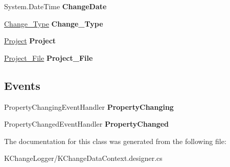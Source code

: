 \begin{DoxyCompactItemize}
\item 
\hypertarget{class_k_change_logger_1_1_project___change_ab97c8a4b413c800ba3eddd650fd732c6}{System.\-Date\-Time {\bfseries Change\-Date}}\label{class_k_change_logger_1_1_project___change_ab97c8a4b413c800ba3eddd650fd732c6}

\item 
\hypertarget{class_k_change_logger_1_1_project___change_a7b45da2b701ada3eaa770805b640a6a8}{\hyperlink{class_k_change_logger_1_1_change___type}{Change\-\_\-\-Type} {\bfseries Change\-\_\-\-Type}}\label{class_k_change_logger_1_1_project___change_a7b45da2b701ada3eaa770805b640a6a8}

\item 
\hypertarget{class_k_change_logger_1_1_project___change_abb78ee98bbba895799df42d2629fa808}{\hyperlink{class_k_change_logger_1_1_project}{Project} {\bfseries Project}}\label{class_k_change_logger_1_1_project___change_abb78ee98bbba895799df42d2629fa808}

\item 
\hypertarget{class_k_change_logger_1_1_project___change_a427442f7080c7464800dc476e048d7c7}{\hyperlink{class_k_change_logger_1_1_project___file}{Project\-\_\-\-File} {\bfseries Project\-\_\-\-File}}\label{class_k_change_logger_1_1_project___change_a427442f7080c7464800dc476e048d7c7}

\end{DoxyCompactItemize}
\subsection*{Events}
\begin{DoxyCompactItemize}
\item 
\hypertarget{class_k_change_logger_1_1_project___change_ac03c2fd63445b6c82ff8d0fb85707e0f}{Property\-Changing\-Event\-Handler {\bfseries Property\-Changing}}\label{class_k_change_logger_1_1_project___change_ac03c2fd63445b6c82ff8d0fb85707e0f}

\item 
\hypertarget{class_k_change_logger_1_1_project___change_aa82bc027b4f1815007bde9601384dae4}{Property\-Changed\-Event\-Handler {\bfseries Property\-Changed}}\label{class_k_change_logger_1_1_project___change_aa82bc027b4f1815007bde9601384dae4}

\end{DoxyCompactItemize}


The documentation for this class was generated from the following file\-:\begin{DoxyCompactItemize}
\item 
K\-Change\-Logger/K\-Change\-Data\-Context.\-designer.\-cs\end{DoxyCompactItemize}
